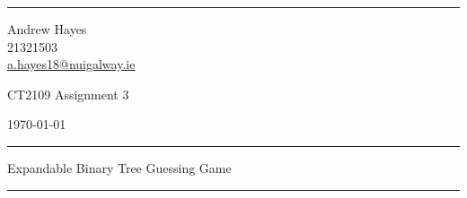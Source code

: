 \documentclass[a4paper]{article}
\begin{document}


\fancyhead[C]{}
\hrule \medskip %
\begin{minipage}{0.295\textwidth} 
    \begin{raggedright}
        \footnotesize
        Andrew Hayes \hfill\\   
        21321503 \hfill\\
        \href{mailto:a.hayes18@nuigalway.ie}{a.hayes18@nuigalway.ie}
    \end{raggedright}
\end{minipage}
\begin{minipage}{0.4\textwidth} 
    \begin{centering}
        \large 
        CT2109 Assignment 3\\ 
        \normalsize 
    \end{centering}
\end{minipage}
\begin{minipage}{0.295\textwidth} 
    \begin{raggedleft}
        \footnotesize
        \today \hfill\\
    \end{raggedleft}
\end{minipage}

\medskip\hrule 
\medskip
\begin{centering}
    Expandable Binary Tree Guessing Game\\ 
\end{centering}
\medskip\hrule 
\bigskip
\end{document}
